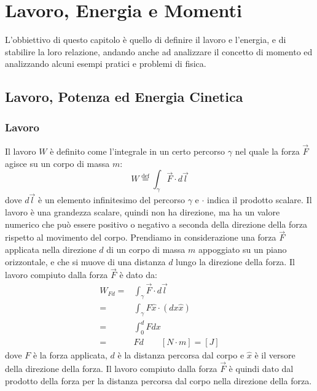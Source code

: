\chapter{Lavoro, Energia e Momenti}
L'obbiettivo di questo capitolo è quello di definire il lavoro e l'energia, e di stabilire la loro relazione, andando anche ad analizzare il concetto di momento ed analizzando alcuni esempi pratici e problemi di fisica.

\section{Lavoro, Potenza ed Energia Cinetica}
    \subsection{Lavoro}
        Il lavoro $W$ è definito come l'integrale in un certo percorso $\gamma$ nel quale la forza $\vec{F}$ agisce su un corpo di massa $m$:
        \begin{equation}
            W \stackrel{\text{def}}{=} \int_{\gamma} \vec{F} \cdot d\vec{l}
        \end{equation}
        dove $d\vec{l}$ è un elemento infinitesimo del percorso $\gamma$ e $\cdot$ indica il prodotto scalare. Il lavoro è una grandezza scalare, quindi non ha direzione, ma ha un valore numerico che può essere positivo o negativo a seconda della direzione della forza rispetto al movimento del corpo.\newline
        Prendiamo in considerazione una forza $\vec{F}$ applicata nella direzione $d$ di un corpo di massa $m$ appoggiato su un piano orizzontale, e che si muove di una distanza $d$ lungo la direzione della forza. Il lavoro compiuto dalla forza $\vec{F}$ è dato da:
        $$
            \begin{aligned}
                W_{Fd} =& \int_{\gamma} \vec{F} \cdot d\vec{l}\\
                =& \int_{\gamma} F\hat{x}\cdot (dx \hat{x})\\
                =& \int_{0}^{d} F dx\\
                =& Fd \qquad [N\cdot m] = [J]
            \end{aligned}
        $$
        dove $F$ è la forza applicata, $d$ è la distanza percorsa dal corpo e $\hat{x}$ è il versore della direzione della forza. Il lavoro compiuto dalla forza $\vec{F}$ è quindi dato dal prodotto della forza per la distanza percorsa dal corpo nella direzione della forza.\newline
